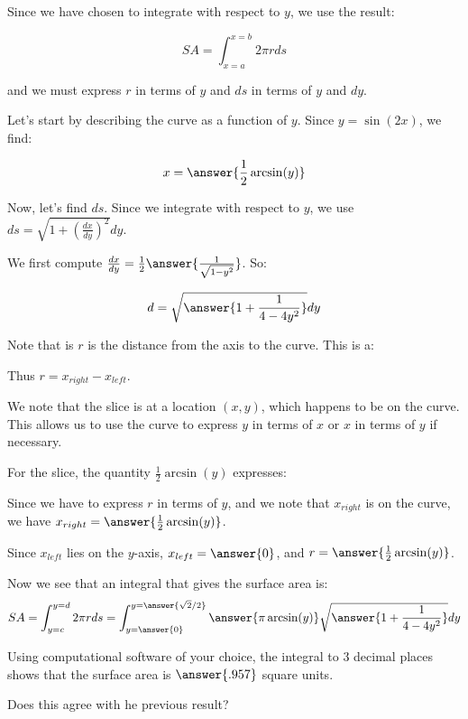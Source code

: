 \documentclass{ximera}
\begin{document}
\begin{exercise}
Since we have chosen to integrate with respect to $y$, we use the result:

\[ SA = \int_{x=a}^{x=b} 2 \pi r ds\]

and we must express $r$ in terms of $y$ and $ds$ in terms of $y$ and $dy$.  


Let's start by describing the curve as a function of $y$.  Since $y=\sin(2x)$, we find:

\[
x= \answer{\frac{1}{2}\arcsin(y)}
\]

Now, let's find $ds$.  Since we integrate with respect to $y$, we use $ds = \sqrt{1+\left(\frac{dx}{dy}\right)^2} dy$.

We first compute $\frac{dx}{dy} = \frac{1}{2} \answer{\frac{1}{\sqrt{1-y^2}}}$.  So: 

\[
d = \sqrt{\answer{1+\frac{1}{4-4y^2}}} dy
\]


\begin{exercise}
Note that is $r$ is the distance from the axis to the curve. This is a:

\begin{multipleChoice}
\end{multipleChoice} 
Thus $r=x_{right}-x_{left}$.  

We note that the slice is at a location $(x,y)$, which happens to be on the curve.  This allows us to use the curve to express $y$ in terms of $x$ or $x$ in terms of $y$ if necessary.  

For the slice, the quantity $\frac{1}{2} \arcsin(y)$ expresses:
\begin{multipleChoice}
\end{multipleChoice} 

Since we have to express $r$ in terms of $y$, and we note that $x_{right}$ is on the curve, we have $x_{right} = \answer{\frac{1}{2} \arcsin(y)}$.

Since $x_{left}$ lies on the $y$-axis, $x_{left} = \answer{0}$, and $r= \answer{\frac{1}{2} \arcsin(y)}$.

\end{exercise}

\begin{exercise}
Now we see that an integral that gives the surface area is: 
\[
SA= \int_{y=c}^{y=d} 2 \pi r ds = \int_{y=\answer{0}}^{y=\answer{\sqrt{2}/2}} \answer{ \pi \arcsin(y)} \sqrt{\answer{1+\frac{1}{4-4y^2}}} dy
\]

\begin{exercise}
Using computational software of your choice, the integral to 3 decimal places shows that the surface area is $\answer{.957}$ square units.  

Does this agree with he previous result?

\begin{multipleChoice}
\end{multipleChoice}

\end{exercise}


\end{exercise}
\end{exercise}
\end{document}
